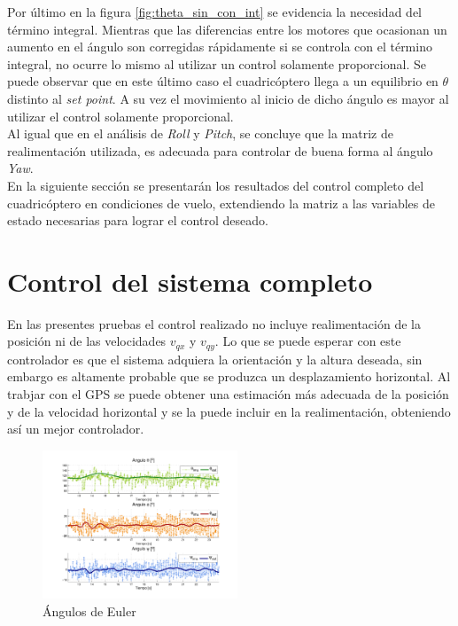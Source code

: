 \documentclass[main]{subfiles}
\begin{document}
Por último en la figura \ref{fig:theta_sin_con_int} se evidencia la necesidad del término integral. Mientras que las diferencias entre los motores que ocasionan un aumento en el ángulo son corregidas rápidamente si se controla con el término integral, no ocurre lo mismo al utilizar un control solamente proporcional. Se puede observar que en este último caso el cuadricóptero llega a un equilibrio en $\theta$ distinto al \emph{set point}. A su vez el movimiento al inicio de dicho ángulo es mayor al utilizar el control solamente proporcional.\\

Al igual que en el análisis de \emph{Roll} y \emph{Pitch}, se concluye que la matriz de realimentación utilizada, es adecuada para controlar de buena forma al ángulo \emph{Yaw}. \\

En la siguiente sección se presentarán los resultados del control completo del cuadricóptero en condiciones de vuelo, extendiendo la matriz a las variables de estado necesarias para lograr el control deseado.

\section{Control del sistema completo}
En las presentes pruebas el control realizado no incluye realimentaci\'on de la posici\'on ni de las velocidades $v_{qx}$ y $v_{qy}$. Lo que se puede esperar con este controlador es que el sistema adquiera la orientaci\'on y la altura deseada, sin embargo es altamente probable que se produzca un desplazamiento horizontal. Al trabjar con el GPS se puede obtener una estimaci\'on m\'as adecuada de la posici\'on y de la velocidad horizontal y se la puede incluir en la realimentaci\'on, obteniendo as\'i un mejor controlador.\\

\begin{figure}
	\centering
	\vspace{-10pt}
	\includegraphics[width=0.52\textwidth]{./pics_test_control/euler.pdf}
	\caption{Ángulos de Euler}
	\label{fig:euler}
\end{figure}
\end{document}

